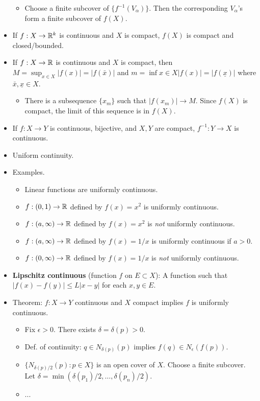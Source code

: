 \documentclass[../../notes.tex]{subfiles}
\begin{document}
\begin{itemize}
\begin{itemize}
        \item Choose a finite subcover of $\{f^{-1}(V_\alpha)\}$. Then the corresponding $V_\alpha$'s form a finite subcover of $f(X)$.
    \end{itemize}
    \item If $f:X\to\mathbb{R}^k$ is continuous and $X$ is compact, $f(X)$ is compact and closed/bounded.
    \item If $f:X\to\mathbb{R}$ is continuous and $X$ is compact, then $M=\sup_{x\in X}|f(x)|=|f(\bar{x})|$ and $m=\inf{x\in X}|f(x)|=|f(\underline{x})|$ where $\bar{x},\underline{x}\in X$.
    \begin{itemize}
        \item There is a subsequence $\{x_m\}$ such that $|f(x_m)|\to M$. Since $f(X)$ is compact, the limit of this sequence is in $f(X)$.
    \end{itemize}
    \item If $f:X\to Y$ is continuous, bijective, and $X,Y$ are compact, $f^{-1}:Y\to X$ is continuous.
    \item Uniform continuity.
    \item Examples.
    \begin{itemize}
        \item Linear functions are uniformly continuous.
        \item $f:(0,1)\to\mathbb{R}$ defined by $f(x)=x^2$ is uniformly continuous.
        \item $f:(a,\infty)\to\mathbb{R}$ defined by $f(x)=x^2$ is \emph{not} uniformly continuous.
        \item $f:(a,\infty)\to\mathbb{R}$ defined by $f(x)=1/x$ is uniformly continuous if $a>0$.
        \item $f:(0,\infty)\to\mathbb{R}$ defined by $f(x)=1/x$ is \emph{not} uniformly continuous.
    \end{itemize}
    \item \textbf{Lipschitz continuous} (function $f$ on $E\subset X$): A function such that $|f(x)-f(y)|\leq L|x-y|$ for each $x,y\in E$.
    \item Theorem: $f:X\to Y$ continuous and $X$ compact implies $f$ is uniformly continuous.
    \begin{itemize}
        \item Fix $\epsilon>0$. There exists $\delta=\delta(p)>0$.
        \item Def. of continuity: $q\in N_{\delta(p)}(p)$ implies $f(q)\in N_\epsilon(f(p))$.
        \item $\{N_{\delta(p)/2}(p):p\in X\}$ is an open cover of $X$. Choose a finite subcover. Let $\delta=\min(\delta(p_1)/2,\dots,\delta(p_n)/2)$.
        \item ...
    \end{itemize}
\end{itemize}
\end{document}
